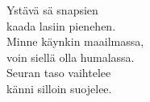 
Ystävä sä snapsien \\ kaada lasiin pienehen. \\ Minne käynkin maailmassa, \\ voin siellä olla humalassa. \\ Seuran taso vaihtelee \\ känni silloin suojelee.